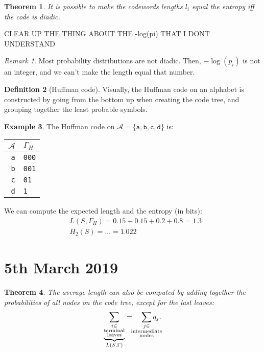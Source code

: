 \documentclass{report}
\theoremstyle{plain}
\newtheorem{thm}{Theorem}
\theoremstyle{definition}
\newtheorem{exmp}[thm]{Example}
\newtheorem{defn}[thm]{Definition}
\theoremstyle{remark}
\newtheorem*{remark}{Remark}
\begin{document}
\begin{thm}
	It is possible to make the codewords lengths $l_i$ equal the entropy iff the code is diadic.
\end{thm}

CLEAR UP THE THING ABOUT THE -log(pi) THAT I DONT UNDERSTAND

\begin{remark}
	Most probability distributions are not diadic. Then, $-\log(p_i)$ is not an integer, and we can't make the length equal that number.
\end{remark}

\begin{defn}[Huffman code]
 Visually, the Huffman code on an alphabet is constructed by going from the bottom up when creating the code tree, and grouping together the least probable symbols.
\end{defn}
\begin{exmp} The Huffman code on $\mathcal A = \{\texttt a, \texttt b, \texttt c, \texttt d\}$ is:
	\begin{center}
	\begin{tabular}{r | l}
		$\mathcal A$ & $\Gamma_H$ \\ \hline
		\texttt a & \texttt{000} \\
		\texttt b & \texttt{001} \\
		\texttt c & \texttt{01} \\
		\texttt d & \texttt{1}
	\end{tabular}
	\end{center}
 We can compute the expected length and the entropy (in bits):
	\begin{align*}
		&L(S, \Gamma_H) = 0.15 + 0. 15 + 0.2 + 0.8 = 1.3 \\
		&H_2(S) = \ldots = 1.022
	\end{align*}
\end{exmp}

\section{5th March 2019}

\begin{thm}
	The average length can also be computed by adding together the probabilities of all nodes on the code tree, except for the last leaves:
	\begin{equation}
		\underbrace{\sum_{\substack{i \in \\ \text{terminal} \\ \text{leaves}}}}_{L(S, \Gamma)} = \quad \sum_{\mathclap{\substack{j \in \\ \text{intermediate} \\ \text{nodes}}}} q_j.
	\end{equation}
\end{thm}
\end{document}
